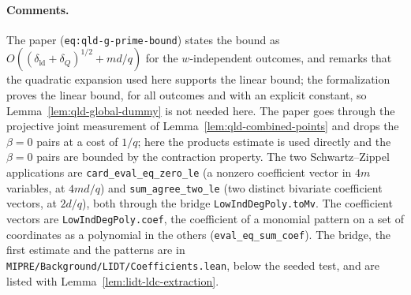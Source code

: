 \paragraph{Comments.} The paper (\texttt{eq:qld-g-prime-bound}) states the bound as
$O((\delta_{\mathrm{ld}} + \delta_Q)^{1/2} + md/q)$ for the $w$-independent outcomes, and
remarks that the quadratic expansion used here supports the linear bound; the formalization
proves the linear bound, for all outcomes and with an explicit constant, so
Lemma~\ref{lem:qld-global-dummy} is not needed here. The paper goes through the projective
joint measurement of Lemma~\ref{lem:qld-combined-points} and drops the $\beta = 0$ pairs at a cost
of $1/q$; here the products estimate is used directly and the $\beta = 0$ pairs are bounded by the
contraction property. The two Schwartz--Zippel applications are
\texttt{card\_eval\_eq\_zero\_le} (a nonzero coefficient vector in $4m$ variables, at $4md/q$)
and \texttt{sum\_agree\_two\_le} (two distinct bivariate coefficient vectors, at $2d/q$), both
through the bridge \texttt{LowIndDegPoly.toMv}. The coefficient vectors are
\texttt{LowIndDegPoly.coef}, the coefficient of a monomial pattern on a set of coordinates as a
polynomial in the others (\texttt{eval\_eq\_sum\_coef}). The bridge, the first estimate and the
patterns are in \texttt{MIPRE/Background/LIDT/Coefficients.lean}, below the seeded test, and are
listed with Lemma~\ref{lem:lidt-ldc-extraction}.

